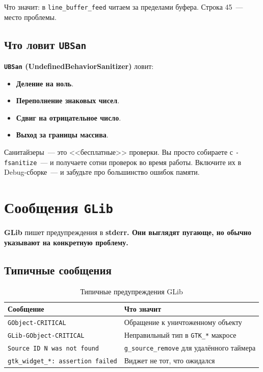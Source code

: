 Что значит: в \texttt{line\_buffer\_feed} читаем
за пределами буфера. Строка 45~--- место проблемы.

\subsection{Что ловит \texttt{UBSan}}

\textbf{\texttt{UBSan} (UndefinedBehaviorSanitizer)} ловит:

\begin{itemize}
    \item \textbf{Деление на ноль}.
    \item \textbf{Переполнение знаковых чисел}.
    \item \textbf{Сдвиг на отрицательное число}.
    \item \textbf{Выход за границы массива}.
\end{itemize}

\begin{ideabox}
Санитайзеры~--- это <<бесплатные>> проверки. Вы
просто собираете с \texttt{-fsanitize}~---
и получаете сотни проверок во время
работы. Включите их в Debug-сборке~---
и забудьте про большинство ошибок
памяти.
\end{ideabox}

\section{Сообщения \texttt{GLib}}
\label{sec:debug-glib}

\textbf{GLib} пишет предупреждения в
\textbf{stderr. Они выглядят пугающе, но обычно указывают на конкретную проблему.}

\subsection{Типичные сообщения}

\begin{table}[htbp]
\centering
\caption{Типичные предупреждения GLib}
\label{tab:glib-warnings}
\small
\begin{tabularx}{\textwidth}{@{}l L@{}}
\toprule
\textbf{Сообщение} & \textbf{Что значит} \\
\midrule
\texttt{GObject-CRITICAL} & Обращение к уничтоженному объекту \\
\texttt{GLib-GObject-CRITICAL} & Неправильный тип в \texttt{GTK\_*} макросе \\
\texttt{Source ID N was not found} & \texttt{g\_source\_remove} для удалённого таймера \\
\texttt{gtk\_widget\_*: assertion failed} & Виджет не тот, что ожидался \\
\bottomrule
\end{tabularx}
\end{table}

